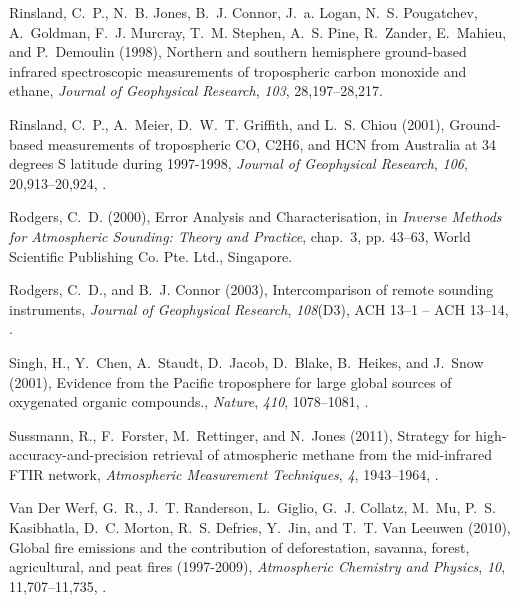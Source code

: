 \documentclass[draft]{agujournal}
\begin{document}
\begin{thebibliography}{19}
Rinsland, C.~P., N.~B. Jones, B.~J. Connor, J.~a. Logan, N.~S. Pougatchev,
  A.~Goldman, F.~J. Murcray, T.~M. Stephen, A.~S. Pine, R.~Zander, E.~Mahieu,
  and P.~Demoulin (1998), {Northern and southern hemisphere ground-based
  infrared spectroscopic measurements of tropospheric carbon monoxide and
  ethane}, \textit{Journal of Geophysical Research}, \textit{103},
  28,197--28,217.

Rinsland, C.~P., A.~Meier, D.~W.~T. Griffith, and L.~S. Chiou (2001),
  {Ground-based measurements of tropospheric CO, C2H6, and HCN from Australia
  at 34 degrees S latitude during 1997-1998}, \textit{Journal of Geophysical
  Research}, \textit{106}, 20,913--20,924, .

Rodgers, C.~D. (2000), {Error Analysis and Characterisation}, in
  \textit{Inverse Methods for Atmospheric Sounding: Theory and Practice},
  chap.~3, pp. 43--63, World Scientific Publishing Co. Pte. Ltd., Singapore.

Rodgers, C.~D., and B.~J. Connor (2003), {Intercomparison of remote sounding
  instruments}, \textit{Journal of Geophysical Research}, \textit{108}(D3), ACH
  13--1 -- ACH 13--14, .

Singh, H., Y.~Chen, A.~Staudt, D.~Jacob, D.~Blake, B.~Heikes, and J.~Snow
  (2001), {Evidence from the Pacific troposphere for large global sources of
  oxygenated organic compounds.}, \textit{Nature}, \textit{410}, 1078--1081,
  .

Sussmann, R., F.~Forster, M.~Rettinger, and N.~Jones (2011), {Strategy for
  high-accuracy-and-precision retrieval of atmospheric methane from the
  mid-infrared FTIR network}, \textit{Atmospheric Measurement Techniques},
  \textit{4}, 1943--1964, .

{Van Der Werf}, G.~R., J.~T. Randerson, L.~Giglio, G.~J. Collatz, M.~Mu, P.~S.
  Kasibhatla, D.~C. Morton, R.~S. Defries, Y.~Jin, and T.~T. {Van Leeuwen}
  (2010), {Global fire emissions and the contribution of deforestation,
  savanna, forest, agricultural, and peat fires (1997-2009)},
  \textit{Atmospheric Chemistry and Physics}, \textit{10}, 11,707--11,735,
  .


\end{thebibliography}
\end{document}
